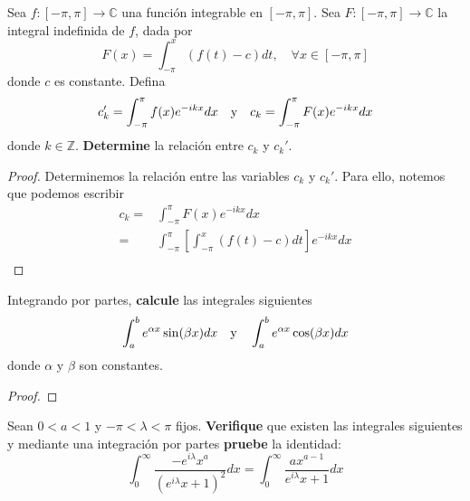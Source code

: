 \documentclass[12pt]{report}
\theoremstyle{largebreak}
\newcommand\cf[3]{\ensuremath{#1:#2\rightarrow#3}}
\begin{document}
    \begin{excer}
        Sea $\cf{f}{[-\pi, \pi]}{\mathbb{C}}$ una función integrable en $[-\pi, \pi]$. Sea $\cf{F}{[-\pi, \pi]}{\mathbb{C}}$ la integral indefinida de $f$, dada por
        \begin{equation*}
            F(x)=\int_{-\pi}^{x}\left(f(t)-c\right)dt,\quad\forall x\in[-\pi, \pi]
        \end{equation*}
        donde $c$ es constante. Defina
        \begin{equation*}
            c_k'=\int_{-\pi}^{\pi}f(x)e^{-ikx}dx\quad\textup{y}\quad c_k=\int_{-\pi}^{\pi}F(x)e^{-ikx}dx
        \end{equation*}
        donde $k\in\mathbb{Z}$. \textbf{Determine} la relación entre $c_k$ y $c_k'$.
    \end{excer}

    \begin{proof}
        Determinemos la relación entre las variables $c_k$ y $c_k'$. Para ello, notemos que podemos escribir
        \begin{equation*}
            \begin{split}
                c_k = & \int_{-\pi}^{\pi}F(x)e^{-ikx}dx\\
                = & \int_{-\pi}^{\pi}\left[\int_{-\pi}^{x}\left(f(t)-c\right)dt\right]e^{-ikx}dx\\
            \end{split}
        \end{equation*}        
    \end{proof}

    \begin{excer}
        Integrando por partes, \textbf{calcule} las integrales siguientes
        \begin{equation*}
            \int_{a}^{b}e^{\alpha x}\sin(\beta x)dx\quad\textup{y}\quad\int_{a}^{b}e^{\alpha x}\cos(\beta x)dx
        \end{equation*}
        donde $\alpha$ y $\beta$ son constantes.
    \end{excer}

    \begin{proof}
        
    \end{proof}

    \begin{excer}
        Sean $0<a<1$ y $-\pi<\lambda<\pi$ fijos. \textbf{Verifique} que existen las integrales siguientes y mediante una integración por partes \textbf{pruebe} la identidad:
        \begin{equation*}
            \int_{0}^{\infty}\frac{-e^{i\lambda}x^a}{(e^{i\lambda}x+1)^2}dx=\int_{0}^{\infty}\frac{ax^{a-1}}{e^{i\lambda}x+1}dx
        \end{equation*}
    \end{excer}
\end{document}

